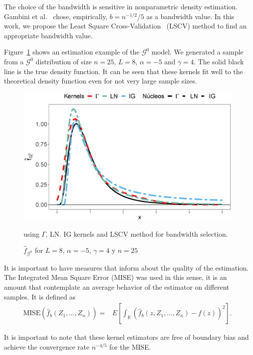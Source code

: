 \documentclass[twocolumn]{svjour3}
\begin{document}
	The choice of the bandwidth is sensitive in nonparametric density estimation. Gambini et al.~\cite{gambini2015} chose, empirically, $b=n^{-1/2}/5$ as a bandwidth value. In this work, we propose the Least Square Cross-Validation~\cite{Wu1997} (LSCV) method to find an appropriate bandwidth value.
	
	Figure~\ref{EstimacionLNyGAyIG} shows an estimation example of the $\mathcal{G}^0$ model. We generated a sample from a $\mathcal{G}^0$ distribution of size $n=25$, $L = 8$, $\alpha=-5$ and $\gamma=4$. The solid black line is the
	true density function. It can be seen that these kernels fit well to the theoretical density function even for not very large sample sizes.
	
	\begin{figure}[H]
		\includegraphics[scale=0.35]{../../../Figures/PaperTesis/NucleosGALNyIG.eps}
		\caption{\label{EstimacionLNyGAyIG} $\widehat{f}_{\mathcal{G}^0}$ for $L=8$, $\alpha=-5$, $\gamma=4$ y $n=25$} using $\Gamma$, LN. IG kernels and LSCV method for bandwidth selection.
	\end{figure}
	
	
	It is important to have measures that inform about the quality of the estimation. The Integrated Mean Square Error (MISE) was used in this sense, it is an amount that
	contemplate an average behavior of the estimator on different samples. It is defined as
	\begin{align}
	\label{Mise}
	\text{MISE}(\widehat{f}_b(Z_1,\ldots,Z_n))=&E\left[\int_\mathbb{R} (\widehat{f}_b(z,Z_1,\ldots,Z_n)-f(z))^2 \right].
	\end{align}
	
	It is important to note that these kernel estimators are free of boundary bias and achieve the convergence rate $n^{-4/5}$ for the MISE.
	
\end{document}
